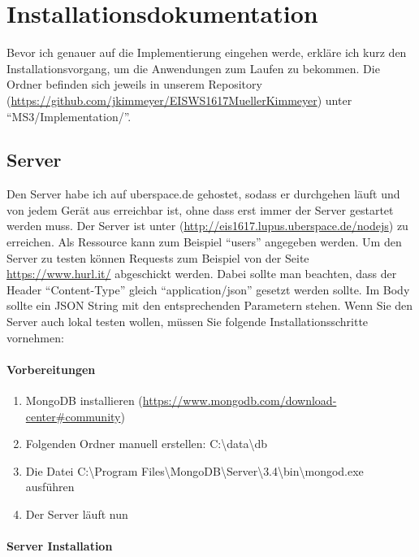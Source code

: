 \chapter{Installationsdokumentation}

Bevor ich genauer auf die Implementierung eingehen werde, erkläre ich kurz den Installationsvorgang, um die Anwendungen zum Laufen zu bekommen. Die Ordner befinden sich jeweils in unserem Repository (\url{https://github.com/jkimmeyer/EISWS1617MuellerKimmeyer}) unter ``MS3/Implementation/''.

\section{Server}

Den Server habe ich auf uberspace.de gehostet, sodass er durchgehen läuft und von jedem Gerät aus erreichbar ist, ohne dass erst immer der Server gestartet werden muss. Der Server ist unter (\url{http://eis1617.lupus.uberspace.de/nodejs}) zu erreichen. Als Ressource kann zum Beispiel ``users'' angegeben werden. Um den Server zu testen können Requests zum Beispiel von der Seite \url{https://www.hurl.it/} abgeschickt werden. Dabei sollte man beachten, dass der Header ``Content-Type'' gleich ``application/json'' gesetzt werden sollte. Im Body sollte ein JSON String mit den entsprechenden Parametern stehen. Wenn Sie den Server auch lokal testen wollen, müssen Sie folgende Installationsschritte vornehmen:

\subsubsection{Vorbereitungen}

\begin{enumerate}
\item MongoDB installieren (\url{https://www.mongodb.com/download-center#community})
\item Folgenden Ordner manuell erstellen: C:{\textbackslash}data{\textbackslash}db
\item Die Datei C:{\textbackslash}Program Files{\textbackslash}MongoDB{\textbackslash}Server{\textbackslash}3.4{\textbackslash}bin{\textbackslash}mongod.exe ausführen
\item Der Server läuft nun
\end{enumerate}

\subsubsection{Server Installation}

